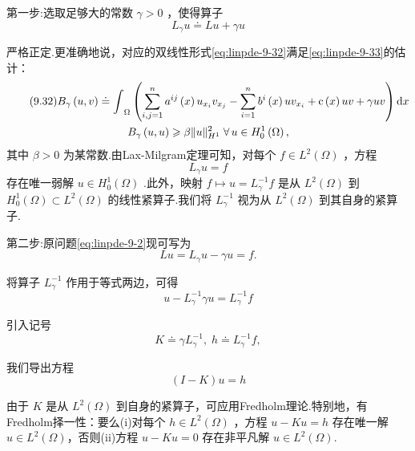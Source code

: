 第一步:选取足够大的常数 $\gamma  > 0$ ，使得算子
\begin{equation}\tag{9.31}\label{eq:linpde-9-31}
{L}_{\gamma }u \doteq  {Lu} + {\gamma u}
\end{equation}

严格正定.更准确地说，对应的双线性形式\eqref{eq:linpde-9-32}满足\eqref{eq:linpde-9-33}的估计：
\begin{gather}\tag{9.32}\label{eq:linpde-9-32}
    {B}_{\gamma }\left(  {u,v}\right)   \doteq  {\int }_{\Omega }\left( {\sum_{{i,j = 1}}^{n}{a}^{ij}\left( x\right) {u}_{{x}_{i}}{v}_{{x}_{j}} - \sum_{{i = 1}}^{n}{b}^{i}\left( x\right) u{v}_{{x}_{i}} + \mathrm{c}\left( x\right) {uv} + {\gamma uv}}\right) {\mathop{}\!\mathrm{d} x} \\ \label{eq:linpde-9-33}
{B}_{\gamma }\left(  {u,u}\right)   \geqslant  \beta \| u{\| }_{{H}^{1}}^{2}\;\forall\,u \in  {H}_{0}^{1}\left( \Omega \right) ,
\end{gather}
其中 $\beta  > 0$ 为某常数.由Lax-Milgram定理可知，对每个 $f \in  {L}^{2}\left( \Omega \right)$ ，方程
\[
{L}_{\gamma }u = f
\]
存在唯一弱解 $u \in  {H}_{0}^{1}\left( \Omega \right)$ .此外，映射 $f \mapsto  u = {L}_{\gamma }^{-1}f$ 是从 ${L}^{2}\left( \Omega \right)$ 到 ${H}_{0}^{1}\left( \Omega \right)  \subset  {L}^{2}\left( \Omega \right)$ 的线性紧算子.我们将 ${L}_{\gamma }^{-1}$ 视为从 ${L}^{2}\left( \Omega \right)$ 到其自身的紧算子.

第二步:原问题\eqref{eq:linpde-9-2}现可写为
\[
{Lu} = {L}_{\gamma }u - {\gamma u} = f.
\]

将算子 ${L}_{\gamma }^{-1}$ 作用于等式两边，可得
\begin{equation}\tag{9.34}\label{eq:linpde-9-34}
u - {L}_{\gamma }^{-1}{\gamma u} = {L}_{\gamma }^{-1}f
\end{equation}

引入记号
\begin{equation}\tag{9.35}\label{eq:linpde-9-35}
K \doteq  \gamma {L}_{\gamma }^{-1},\;h \doteq  {L}_{\gamma }^{-1}f,
\end{equation}

我们导出方程
\begin{equation}\tag{9.36}\label{eq:linpde-9-36}
\left( {I - K}\right) u = h
\end{equation}

由于 $K$ 是从 ${L}^{2}\left( \Omega \right)$ 到自身的紧算子，可应用Fredholm理论.特别地，有Fredholm择一性：要么(i)对每个 $h \in  {L}^{2}\left( \Omega \right)$ ，方程 $u - {Ku} = h$ 存在唯一解 $u \in  {L}^{2}\left( \Omega \right)$，否则(ii)方程 $u - {Ku} = 0$ 存在非平凡解 $u \in  {L}^{2}\left( \Omega \right)$.

